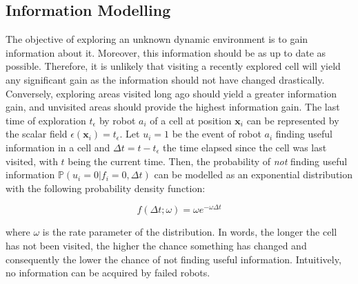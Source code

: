 \subsection{Information Modelling}
The objective of exploring an unknown dynamic environment is to gain
information about it. Moreover, this information should be as up to
date as possible. Therefore, it is unlikely that visiting a recently
explored cell will yield any significant gain as the information
should not have changed drastically. Conversely, exploring areas
visited long ago should yield a greater information gain, and
unvisited areas should provide the highest information gain. The last
time of exploration $t_\epsilon$ by robot $a_i$ of a cell at position
$\bm{x}_i$ can be represented by the scalar field
$\epsilon(\bm{x}_i) = t_\epsilon$. Let $u_i=1$ be the event of robot
$a_i$ finding useful information in a cell and
$\Delta t = t-t_\epsilon$ the time elapsed since the cell was last
visited, with $t$ being the current time. Then, the probability of
\textit{not} finding useful information
$\mathbb{P}(u_i=0 | f_i=0, \Delta t)$ can be modelled as an
exponential distribution with the following probability density
function:

\begin{equation}
    f(\Delta t;\omega) = \omega e^{-\omega\Delta t}
    \label{eq:information}
\end{equation}

where $\omega$ is the rate parameter of the distribution. In words,
the longer the cell has not been visited, the higher the chance
something has changed and consequently the lower the chance of not
finding useful information. Intuitively, no information can be acquired by failed robots.

